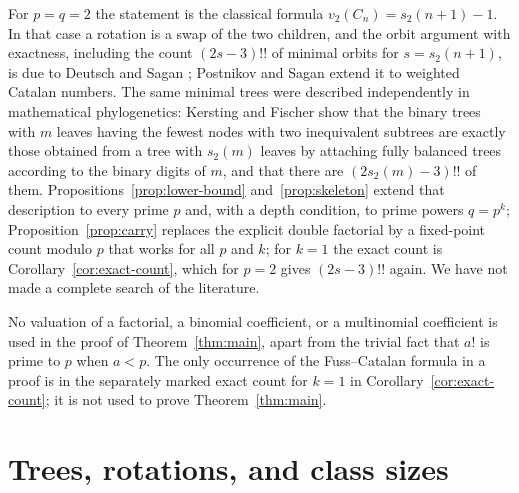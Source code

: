\documentclass[11pt]{amsart}
\theoremstyle{definition}
\theoremstyle{remark}
\begin{document}
For $p=q=2$ the statement is the classical formula $v_2(C_n)=s_2(n+1)-1$.  In that case a rotation is a swap of the two children, and the orbit argument with exactness, including the count $(2s-3)!!$ of minimal orbits for $s=s_2(n+1)$, is due to Deutsch and Sagan \cite{DeutschSagan}; Postnikov and Sagan \cite{PostnikovSagan} extend it to weighted Catalan numbers.  The same minimal trees were described independently in mathematical phylogenetics: Kersting and Fischer \cite{KerstingFischer} show that the binary trees with $m$ leaves having the fewest nodes with two inequivalent subtrees are exactly those obtained from a tree with $s_2(m)$ leaves by attaching fully balanced trees according to the binary digits of $m$, and that there are $(2s_2(m)-3)!!$ of them.  Propositions~\ref{prop:lower-bound} and~\ref{prop:skeleton} extend that description to every prime $p$ and, with a depth condition, to prime powers $q=p^k$; Proposition~\ref{prop:carry} replaces the explicit double factorial by a fixed-point count modulo $p$ that works for all $p$ and $k$; for $k=1$ the exact count is Corollary~\ref{cor:exact-count}, which for $p=2$ gives $(2s-3)!!$ again.  We have not made a complete search of the literature.

No valuation of a factorial, a binomial coefficient, or a multinomial coefficient is used in the proof of Theorem~\ref{thm:main}, apart from the trivial fact that $a!$ is prime to $p$ when $a<p$.  The only occurrence of the Fuss--Catalan formula in a proof is in the separately marked exact count for $k=1$ in Corollary~\ref{cor:exact-count}; it is not used to prove Theorem~\ref{thm:main}.

\section{Trees, rotations, and class sizes}
\end{document}
